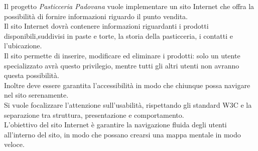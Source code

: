 Il progetto \emph{Pasticceria Padovana} vuole implementare un sito Internet che offra la possibilità di fornire informazioni riguardo il punto vendita.\\
Il sito Internet dovrà contenere informazioni riguardanti i prodotti disponibili,suddivisi in paste e torte, la storia della pasticceria, i contatti e l'ubicazione.\\
Il sito permette di inserire, modificare ed eliminare i prodotti: solo un utente specializzato avrà questo privilegio, mentre tutti gli altri utenti non avranno questa possibilità.\\
Inoltre deve essere garantita l'accessibilità in modo che chiunque possa navigare nel sito serenamente.\\
Si vuole focalizzare l'attenzione sull'usabilità, rispettando gli standard W3C e la separazione tra struttura, presentazione e comportamento.\\
L'obiettivo del sito Internet è garantire la navigazione fluida degli utenti all'interno del sito, in modo che possano crearsi una mappa mentale in modo veloce.\\

